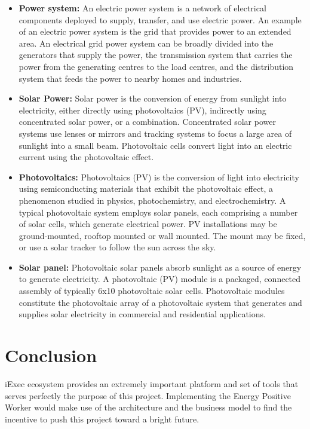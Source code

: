 \begin{itemize}
        \item \textbf{Power system:} An electric power system is a network of electrical components deployed to
        supply, transfer, and use electric power. An example of an electric power system is the grid that provides
        power to an extended area. An electrical grid power system can be broadly divided into the generators that
        supply the power, the transmission system that carries the power from the generating centres to the load
        centres, and the distribution system that feeds the power to nearby homes and
        industries\cite{power-system}.

        \item \textbf{Solar Power:} Solar power is the conversion of energy from sunlight into electricity, either
        directly using photovoltaics (PV), indirectly using concentrated solar power, or a combination.
        Concentrated solar power systems use lenses or mirrors and tracking systems to focus a large area of
        sunlight into a small beam. Photovoltaic cells convert light into an electric current using the
        photovoltaic effect\cite{solar-power}.

        \item \textbf{Photovoltaics:} Photovoltaics (PV) is the conversion of light into electricity using
        semiconducting materials that exhibit the photovoltaic effect, a phenomenon studied in physics,
        photochemistry, and electrochemistry. A typical photovoltaic system employs solar panels, each comprising
        a number of solar cells, which generate electrical power. PV installations may be ground-mounted, rooftop
        mounted or wall mounted. The mount may be fixed, or use a solar tracker to follow the sun across the
        sky\cite{photovoltaics}.

        \item \textbf{Solar panel:} Photovoltaic solar panels absorb sunlight as a source of energy to generate
        electricity. A photovoltaic (PV) module is a packaged, connected assembly of typically 6x10 photovoltaic
        solar cells. Photovoltaic modules constitute the photovoltaic array of a photovoltaic system that generates
        and supplies solar electricity in commercial and residential applications\cite{solar-panel}.
        
    \end{itemize}

\section{Conclusion}
    iExec ecosystem provides an extremely important platform and set of tools that serves perfectly the purpose of
    this project. Implementing the Energy Positive Worker would make use of the architecture and the business
    model to find the incentive to push this project toward a bright future.